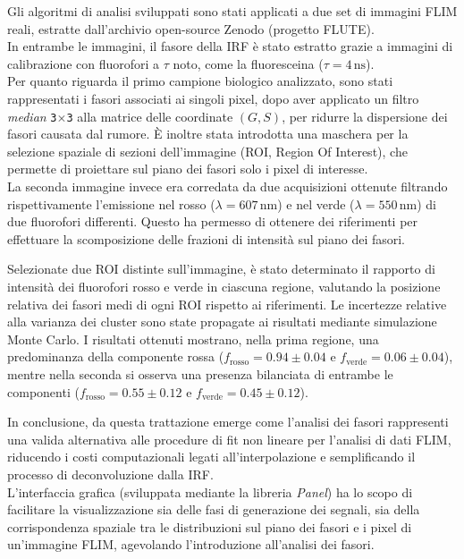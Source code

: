 \documentclass[a4paper, 11pt]{article}
\begin{document}
Gli algoritmi di analisi sviluppati sono stati applicati a due set di immagini FLIM reali, estratte dall'archivio open-source Zenodo (progetto FLUTE).\\
In entrambe le immagini, il fasore della IRF è stato estratto grazie a immagini di calibrazione con fluorofori a $\tau$ noto, come la fluoresceina ($\tau=4\,\text{ns}$).\\
Per quanto riguarda il primo campione biologico analizzato, sono stati rappresentati i fasori associati ai singoli pixel, dopo aver applicato un filtro \textit{median} \texttt{3}$\times$\texttt{3} alla matrice delle coordinate $(G, S)$, per ridurre la dispersione dei fasori causata dal rumore. È inoltre stata introdotta una maschera per la selezione spaziale di sezioni dell'immagine (ROI, Region Of Interest), che permette di proiettare sul piano dei fasori solo i pixel di interesse.\\
La seconda immagine invece era corredata da due acquisizioni ottenute filtrando rispettivamente l'emissione nel rosso ($\lambda = 607\, \text{nm}$) e nel verde ($\lambda = 550\, \text{nm}$) di due fluorofori differenti. Questo ha permesso di ottenere dei riferimenti per effettuare la scomposizione delle frazioni di intensità sul piano dei fasori.

Selezionate due ROI distinte sull'immagine, è stato determinato il rapporto di intensità dei fluorofori rosso e verde in ciascuna regione, valutando la posizione relativa dei fasori medi di ogni ROI rispetto ai riferimenti. Le incertezze relative alla varianza dei cluster sono state propagate ai risultati mediante simulazione Monte Carlo.
I risultati ottenuti mostrano, nella prima regione, una predominanza della componente rossa ($f_{\text{rosso}} = 0.94 \pm 0.04$ e $f_{\text{verde}} = 0.06 \pm 0.04$), mentre nella seconda si osserva una presenza bilanciata di entrambe le componenti ($f_{\text{rosso}} = 0.55 \pm 0.12$ e $f_{\text{verde}} = 0.45 \pm 0.12$).


In conclusione, da questa trattazione emerge come l'analisi dei fasori rappresenti una valida alternativa alle procedure di fit non lineare per l'analisi di dati FLIM, riducendo i costi computazionali legati all'interpolazione e semplificando il processo di deconvoluzione dalla IRF.\\
L'interfaccia grafica (sviluppata mediante la libreria \textit{Panel}) ha lo scopo di facilitare la visualizzazione sia delle fasi di generazione dei segnali, sia della corrispondenza spaziale tra le distribuzioni sul piano dei fasori e i pixel di un'immagine FLIM, agevolando l'introduzione all'analisi dei fasori.
\end{document}
